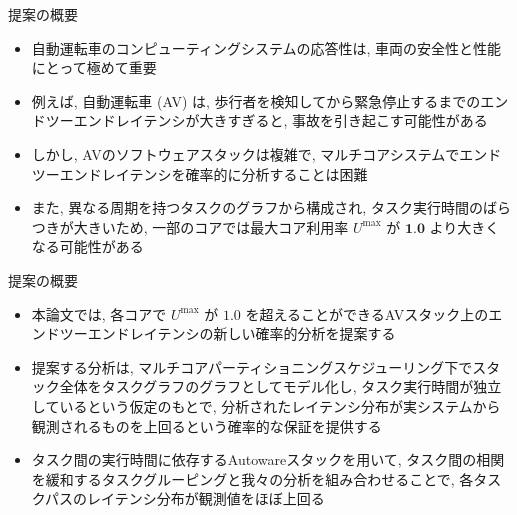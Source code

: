 
\begin{frame}{提案の概要}
    \begin{itemize}
        \item 自動運転車のコンピューティングシステムの応答性は, 車両の安全性と性能にとって極めて重要
        \item 例えば, 自動運転車 (AV) は, 歩行者を検知してから緊急停止するまでのエンドツーエンドレイテンシが大きすぎると, 事故を引き起こす可能性がある
        \item しかし, AVのソフトウェアスタックは複雑で, マルチコアシステムでエンドツーエンドレイテンシを確率的に分析することは困難
        \item また, 異なる周期を持つタスクのグラフから構成され, タスク実行時間のばらつきが大きいため, 一部のコアでは最大コア利用率 $U^{\max }$ が $\mathbf{1 . 0}$ より大きくなる可能性がある
    \end{itemize}
\end{frame}

\begin{frame}{提案の概要}
    \begin{itemize}
        \item 本論文では, 各コアで $U^{\max }$ が $1.0$ を超えることができるAVスタック上のエンドツーエンドレイテンシの新しい確率的分析を提案する
        \item 提案する分析は, マルチコアパーティショニングスケジューリング下でスタック全体をタスクグラフのグラフとしてモデル化し, タスク実行時間が独立しているという仮定のもとで, 分析されたレイテンシ分布が実システムから観測されるものを上回るという確率的な保証を提供する
        \item タスク間の実行時間に依存するAutowareスタックを用いて, タスク間の相関を緩和するタスクグルーピングと我々の分析を組み合わせることで, 各タスクパスのレイテンシ分布が観測値をほぼ上回る
    \end{itemize}
\end{frame}

